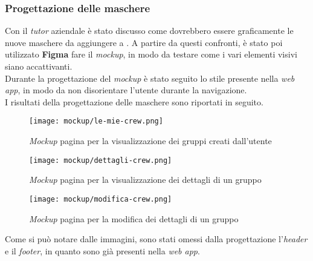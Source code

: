 \subsubsection{Progettazione delle maschere}
Con il \textit{tutor} aziendale è stato discusso come dovrebbero essere
graficamente le nuove maschere da aggiungere a \productName. A partire da
questi confronti, è stato poi utilizzato \textbf{Figma} fare il
\textit{mockup}, in modo da  testare come i vari elementi visivi siano
accattivanti.\\
Durante la progettazione del \textit{mockup} è stato seguito lo stile presente
nella \textit{web app}, in modo da non disorientare l'utente durante la
navigazione. \\
I risultati della progettazione delle maschere sono riportati in seguito.
\begin{figure}[H]
    \centerline{\texttt{[image: mockup/le-mie-crew.png]}}
    \caption{\textit{Mockup} pagina per la visualizzazione dei gruppi creati
        dall'utente}
\end{figure}


\begin{figure}[H]
    \centering
    \texttt{[image: mockup/dettagli-crew.png]}
    \caption{\textit{Mockup} pagina per la visualizzazione dei dettagli di un
        gruppo}
\end{figure}

\begin{figure}[H]
    \centering
    \texttt{[image: mockup/modifica-crew.png]}
    \caption{\textit{Mockup} pagina per la modifica dei dettagli di un gruppo}
\end{figure}

Come si può notare dalle immagini, sono stati omessi dalla progettazione
l'\textit{header} e il \textit{footer}, in quanto sono già presenti nella
\textit{web app}.



